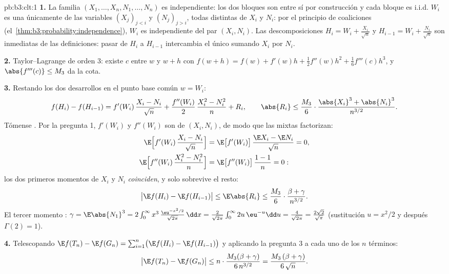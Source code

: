 \begin{solution}{pb:b3:clt:1}
\textbf{1.} La familia $(X_1, \dots, X_n, N_1, \dots, N_n)$ es
independiente: los dos bloques
son  entre sí
por construcción y cada bloque es i.i.d. $W_i$ es una
 únicamente de las
variables $(X_j)_{j<i}$ y $(N_j)_{j>i}$, todas distintas de $X_i$ y
$N_i$: por el principio de coaliciones
(el~\cref{thm:b3:probability:independence}), $W_i$ es
independiente del par
$(X_i, N_i)$. Las descomposiciones $H_i = W_i + \frac{X_i}{\sqrt n}$ y
$H_{i-1} = W_i +
\frac{N_i}{\sqrt n}$ son inmediatas de las definiciones: pasar de $H_i$
a $H_{i-1}$ intercambia el único sumando $X_i$ por $N_i$.

\textbf{2.} Taylor--Lagrange de orden $3$: existe $c$ entre $w$ y
$w + h$ con $f(w + h) = f(w) + f'(w)h +
\frac12f''(w)h^2 + \frac16f'''(c)h^3$, y $\abs{f'''(c)}
\leq M_3$ da la cota.

\textbf{3.} Restando los dos desarrollos en el punto base común
$w = W_i$:
\[
f(H_i) - f(H_{i-1}) = f'(W_i)\,\frac{X_i - N_i}{\sqrt n} +
\frac{f''(W_i)}{2}\,\frac{X_i^2 - N_i^2}{n} + R_i,
\qquad
\abs{R_i} \leq \frac{M_3}{6}\cdot
\frac{\abs{X_i}^3 + \abs{N_i}^3}{n^{3/2}} .
\]
Tómense . Por la pregunta
1, $f'(W_i)$ y $f''(W_i)$ son
 de
$(X_i, N_i)$, de modo que las
 mixtas factorizan:
\begin{align*}
\E\Bigl[f'(W_i)\,\frac{X_i - N_i}{\sqrt n}\Bigr] &=
\E\bigl[f'(W_i)\bigr]\,\frac{\E X_i - \E N_i}{\sqrt n} = 0,
\\
\E\Bigl[f''(W_i)\,\frac{X_i^2 - N_i^2}{n}\Bigr] &=
\E\bigl[f''(W_i)\bigr]\,\frac{1 - 1}{n} = 0 :
\end{align*}
los dos primeros momentos de $X_i$ y $N_i$ \emph{coinciden}, y solo
sobrevive el resto:
\[
\bigl|\E f(H_i) - \E f(H_{i-1})\bigr| \leq \E\abs{R_i} \leq
\frac{M_3}{6}\cdot\frac{\beta + \gamma}{n^{3/2}} .
\]
El tercer momento :
$\gamma = \E\abs{N_1}^3 =
2\int_0^\infty x^3\,\frac{\eu^{-x^2/2}}{\sqrt{2\pi}}\,\dd x
= \frac{2}{\sqrt{2\pi}}\int_0^\infty 2u\,\eu^{-u}\dd u =
\frac{4}{\sqrt{2\pi}} = \frac{2\sqrt2}{\sqrt\pi}$ (sustitución
$u = x^2/2$ y después $\Gamma(2) = 1$).

\textbf{4.} Telescopando $\E f(T_n) - \E f(G_n) =
\sum_{i=1}^n\bigl(\E f(H_i) - \E f(H_{i-1})\bigr)$ y aplicando la
pregunta 3 a cada uno de los $n$ términos:
\[
\bigl|\E f(T_n) - \E f(G_n)\bigr| \leq
n \cdot \frac{M_3(\beta + \gamma)}{6\,n^{3/2}} =
\frac{M_3\,(\beta + \gamma)}{6\,\sqrt n} .
\]


\end{solution}
